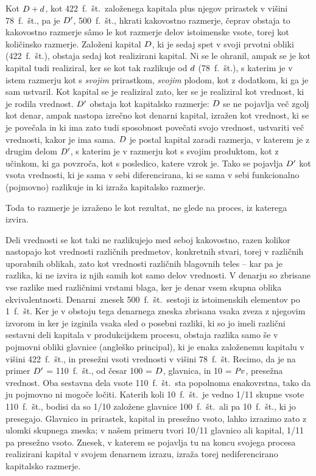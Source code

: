 \documentclass[kapital_02.tex]{subfiles}
\begin{document}
Kot \(D + d\), kot 422\ f.\ št.\ založenega kapitala plus njegov prirastek v višini 78\ f.\ št., pa je \(D'\), 500\ f.\ št., hkrati kakovostno razmerje, čeprav obstaja to kakovostno razmerje s\^amo le kot razmerje delov istoimenske vsote, torej kot količinsko razmerje. Založeni kapital \(D\), ki je sedaj spet v svoji prvotni obliki (422\ f.\ št.), obstaja sedaj kot realizirani kapital. Ni se le ohranil, ampak se je kot kapital tudi realiziral, ker se kot tak razlikuje od \(d\) (78\ f.\ št.), s katerim je v istem razmerju kot s \emph{svojim} prirastkom, \emph{svojim} plodom, kot z dodatkom, ki ga je sam ustvaril. Kot kapital se je realiziral zato, ker se je realiziral kot vrednost, ki je rodila vrednost. \(D'\) obstaja kot kapitalsko razmerje: \(D\) se ne pojavlja več zgolj kot denar, ampak nastopa izrečno kot denarni kapital, izražen kot vrednost, ki se je povečala in ki ima zato tudi sposobnost povečati svojo vrednost, ustvariti več vrednosti, kakor je ima sama. \(D\) je postal kapital zaradi razmerja, v katerem je z drugim delom \(D'\), s katerim je v razmerju kot s svojim produktom, kot z učinkom, ki ga povzroča, kot s posledico, katere vzrok je. Tako se pojavlja \(D'\) kot vsota vrednosti, ki je sama v sebi diferencirana, ki se sama v sebi funkcionalno (pojmovno) razlikuje in ki izraža kapitalsko razmerje.

Toda to razmerje je izraženo le kot rezultat, ne glede na proces, iz katerega izvira.

Deli vrednosti se kot taki ne razlikujejo med seboj kakovostno, razen kolikor nastopajo kot vrednosti različnih predmetov, konkretnih stvari, torej v različnih uporabnih oblikah, zato kot vrednosti različnih blagovnih teles -- kar pa je razlika, ki ne izvira iz njih samih kot samo delov vrednosti. V denarju so zbrisane vse razlike med različnimi vrstami blaga, ker je denar vsem skupna oblika ekvivalentnosti. Denarni\KPEstran\ znesek 500\ f.\ št.\ sestoji iz istoimenskih elementov po 1\ f.\ št. Ker je v obstoju tega denarnega zneska zbrisana vsaka zveza z njegovim izvorom in ker je izginila vsaka sled o posebni razliki, ki so jo imeli različni sestavni deli kapitala v produkcijskem procesu, obstaja razlika samo še v pojmovni obliki glavnice (angleško principal), ki je enaka založenemu kapitalu v višini 422\ f.\ št., in presežni vsoti vrednosti v višini 78\ f.\ št. Recimo, da je na primer \(D'\) = 110\ f.\ št., od česar 100 = \(D\), glavnica, in 10 = \(\mathit{Pv}\), presežna vrednost. Oba sestavna dela vsote 110\ f.\ št.\ sta popolnoma enakovrstna, tako da ju pojmovno ni mogoče ločiti. Katerih koli 10\ f.\ št.\ je vedno 1/11 skupne vsote 110\ f.\ št., bodisi da so 1/10 založene glavnice 100\ f.\ št.\ ali pa 10\ f.\ št., ki jo presegajo. Glavnico in prirastek, kapital in presežno vsoto, lahko izrazimo zato z ulomki skupnega zneska; v našem primeru tvori 10/11 glavnico ali kapital, 1/11 pa presežno vsoto. Znesek, v katerem se pojavlja tu na koncu svojega procesa realizirani kapital v svojem denarnem izrazu, izraža torej nediferencirano kapitalsko razmerje.
\end{document}
